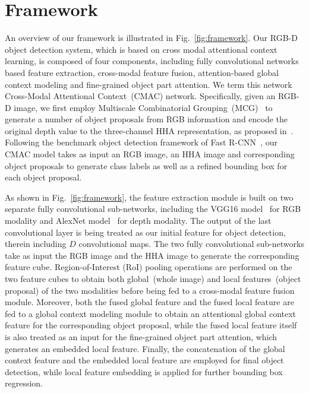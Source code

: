 \documentclass[journal]{IEEEtran}
\begin{document}
\section{Framework}\label{sec:framework}
An overview of our framework is illustrated in Fig.~\ref{fig:framework}. Our RGB-D object detection system, which is based on cross modal attentional context learning, is composed of four components, including fully convolutional networks based feature extraction, cross-modal feature fusion, attention-based global context modeling and fine-grained object part attention. We term this network Cross-Modal Attentional Context~(CMAC) network. Specifically, given an RGB-D image, we first employ Multiscale Combinatorial Grouping~(MCG)~\cite{mcg} to generate a number of object proposals from RGB information and encode the original depth value to the three-channel HHA representation, as proposed in~\cite{gupta2014learning}. Following the benchmark object detection framework of Fast R-CNN~\cite{fast-rcnn}, our CMAC model takes as input an RGB image, an HHA image and corresponding object proposals to generate class labels as well as a refined bounding box for each object proposal. 

As shown in Fig.~\ref{fig:framework}, the feature extraction module is built on two separate fully convolutional sub-networks, including the VGG16 model~\cite{VGG} for RGB modality and AlexNet model~\cite{alexnet} for depth modality. The output of the last convolutional layer is being treated as our initial feature for object detection, therein including $D$ convolutional maps. The two fully convolutional sub-networks take as input the RGB image and the HHA image to generate the corresponding feature cube. Region-of-Interest (RoI) pooling operations are performed on the two feature cubes to obtain both global~(whole image) and local features~(object proposal) of the two modalities before being fed to a cross-modal feature fusion module. Moreover, both the fused global feature and the fused local feature are fed to a global context modeling module to obtain an attentional global context feature for the corresponding object proposal, while the fused local feature itself is also treated as an input for the fine-grained object part attention, which generates an embedded local feature. Finally, the concatenation of the global context feature and the embedded local feature are employed for final object detection, while local feature embedding is applied for further bounding box regression. %
\end{document}
